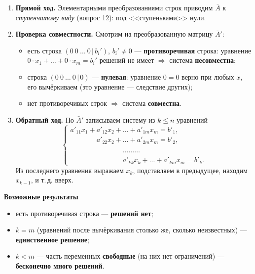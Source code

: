 \documentclass[a4paper,11pt]{article}
\newcommand{\podr}[1]{\par\needspace{8\baselineskip}\medskip
  {\large\bfseries\textcolor{oprc!80!black}{#1}}\par\nopagebreak\smallskip}
\begin{document}
\begin{enumerate}[leftmargin=*]
  \item \textbf{Прямой ход.} Элементарными преобразованиями строк приводим $\bar A$ к \emph{ступенчатому виду} (вопрос 12):
        под <<ступеньками>> нули.
  \item \textbf{Проверка совместности.} Смотрим на преобразованную матрицу $\bar A'$:
    \begin{itemize}[leftmargin=*]
      \item есть строка $(0\ 0\ \dots\ 0 \,|\, b_i')$, $b_i' \ne 0$ --- \textbf{противоречивая} строка: уравнение
            $0 \cdot x_1 + \dots + 0 \cdot x_m = b_i'$ решений не имеет $\Rightarrow$ система \textbf{несовместна};
      \item строка $(0\ 0\ \dots\ 0 \,|\, 0)$ --- \textbf{нулевая}: уравнение $0 = 0$ верно при любых $x$, его вычёркиваем
            (это уравнение --- следствие других);
      \item нет противоречивых строк $\Rightarrow$ система \textbf{совместна}.
    \end{itemize}
  \item \textbf{Обратный ход.} По $\bar A'$ записываем систему из $k \le n$ уравнений
    \[
      \begin{cases}
        a'_{11} x_1 + a'_{12} x_2 + \dots + a'_{1m} x_m = b'_1, \\
        \phantom{a'_{11} x_1 + {}} a'_{22} x_2 + \dots + a'_{2m} x_m = b'_2, \\
        \phantom{a'_{11} x_1 + a'_{12} x_2 + {}} \dots\dots\dots \\
        \phantom{a'_{11} x_1 + a'_{12} x_2 + {}} a'_{kk} x_k + \dots + a'_{km} x_m = b'_k.
      \end{cases}
    \]
    Из последнего уравнения выражаем $x_k$, подставляем в предыдущее, находим $x_{k-1}$, и т.\,д. вверх.
\end{enumerate}

\podr{Возможные результаты}

\begin{itemize}[leftmargin=*]
  \item есть противоречивая строка --- \textbf{решений нет};
  \item $k = m$ (уравнений после вычёркивания столько же, сколько неизвестных) --- \textbf{единственное решение};
  \item $k < m$ --- часть переменных \textbf{свободные} (на них нет ограничений) --- \textbf{бесконечно много решений}.
\end{itemize}
\end{document}
